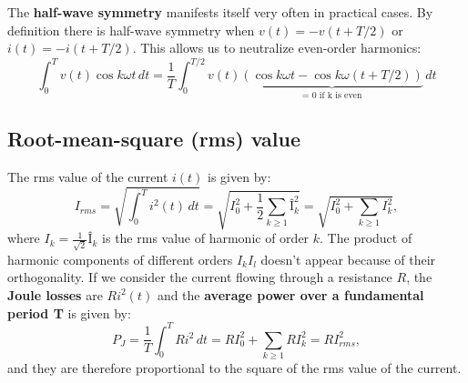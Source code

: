 	The \textbf{half-wave symmetry} manifests itself very often in practical cases. By definition there is half-wave symmetry when $v(t) = -v(t+T/2)$ or $i(t) = -i(t+T/2)$. This allows us to neutralize even-order harmonics: 
	\begin{equation}
		\int _0 ^T v(t)\cos k \omega t \, dt = \frac{1}{T}\int _0 ^{T/2} v(t) \underbrace{\left(\cos k\omega t - \cos k\omega(t+T/2)\right)}_{\mbox{= 0 if k is even}}\, dt
	\end{equation}
	
	\subsection{Root-mean-square (rms) value}
		The rms value of the current $i(t)$ is given by:
		\begin{equation}
			I_{rms} = \sqrt{\int _0 ^T i^2(t) \, dt} = \sqrt{I_0^2 + \frac{1}{2}\sum _{k\geq 1}Î_k ^2 } = \sqrt{I_0^2 + \sum _{k\geq 1} I_k^2},
		\end{equation}
		where $I_k = \frac{1}{\sqrt{2}}Î_k$ is the rms value of harmonic of order $k$. The product of harmonic components of different orders $I_kI_l$ doesn't appear because of their orthogonality. If we consider the current flowing through a resistance $R$, the \textbf{Joule losses} are $Ri^2(t)$ and the \textbf{average power over a fundamental period T} is given by:
		\begin{equation}
			P_J = \frac{1}{T}\int _0^T Ri^2 \, dt = RI_0^2 + \sum _{k\geq 1} RI_k^2 = RI_{rms}^2,
		\end{equation}
		and they are therefore proportional to the square of the rms value of the current.

		
